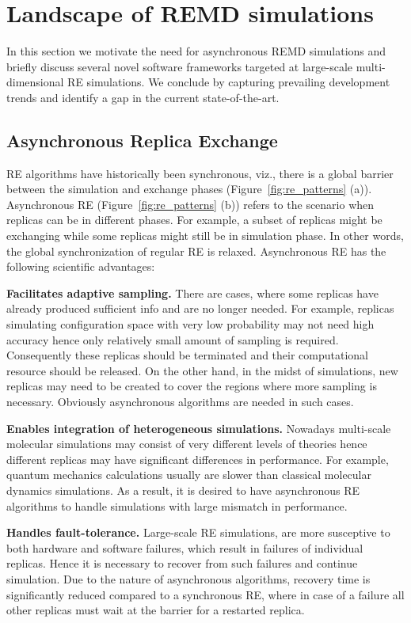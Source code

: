 \documentclass{sig-alternate-05-2015}
\begin{document}
\section{Landscape of REMD simulations} \label{remd.landscape}

In this section we motivate the need for asynchronous REMD simulations and briefly discuss several novel software frameworks targeted at large-scale multi-dimensional RE simulations.  We conclude by capturing prevailing development trends and identify a gap in the current state-of-the-art.

\subsection{Asynchronous Replica Exchange} \label{async}

RE algorithms have historically been synchronous, viz., there is a global barrier between the simulation and exchange phases (Figure~\ref{fig:re_patterns} (a)).  Asynchronous RE (Figure~\ref{fig:re_patterns} (b)) refers to the scenario when replicas can be in different phases. For example, a subset of replicas might be exchanging while some replicas might still be in simulation phase. In other words, the global synchronization of regular RE is relaxed.  Asynchronous RE has the following scientific advantages:

\textbf{Facilitates adaptive sampling.} There are cases, where some replicas have already produced sufficient info and are no longer needed. For example, replicas simulating configuration space with very low probability may not need high accuracy hence only relatively small amount of sampling is required.  Consequently these replicas should be terminated and their computational resource should be released.  On the other hand, in the midst of simulations, new replicas may need to be created to cover the regions where more sampling is necessary.  Obviously asynchronous algorithms are needed in such cases.

\textbf{Enables integration of heterogeneous simulations.} Nowadays multi-scale molecular
simulations may consist of very different levels of theories hence different replicas may
have significant differences in performance. For example, quantum mechanics calculations usually
are slower than classical molecular dynamics simulations. As a result, it is desired to have
asynchronous RE algorithms to handle simulations with large mismatch in performance.

\textbf{Handles fault-tolerance.} Large-scale RE simulations, are more susceptive to both 
hardware and software failures, which result in failures of individual replicas. Hence it is
necessary to recover from such failures and continue simulation. Due to the
nature of asynchronous algorithms, recovery time is significantly reduced compared to a
synchronous RE, where in case of a failure all other replicas must wait at the
barrier for a restarted replica.
\end{document}
